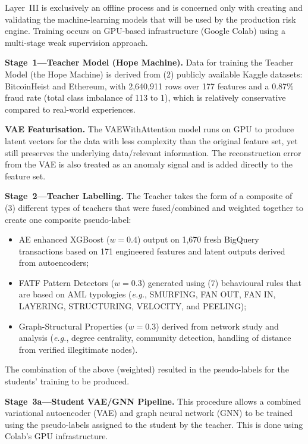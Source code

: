 \documentclass[journal]{IEEEtran}
\newcommand{\eg}{\textit{e.g.}}
\begin{document}
Layer~III is exclusively an offline process and is concerned only with creating and validating the machine-learning models that will be used by the production risk engine. Training occurs on GPU-based infrastructure (Google Colab) using a multi-stage weak supervision approach.

\textbf{Stage~1---Teacher Model (Hope Machine).} Data for training the Teacher Model (the Hope Machine) is derived from (2) publicly available Kaggle datasets: BitcoinHeist and Ethereum, with 2,640,911 rows over 177 features and a 0.87\% fraud rate (total class imbalance of 113 to 1), which is relatively conservative compared to real-world experiences.

\textbf{VAE Featurisation.} The VAEWithAttention model runs on GPU to produce latent vectors for the data with less complexity than the original feature set, yet still preserves the underlying data/relevant information. The reconstruction error from the VAE is also treated as an anomaly signal and is added directly to the feature set.

\textbf{Stage~2---Teacher Labelling.} The Teacher takes the form of a composite of (3) different types of teachers that were fused/combined and weighted together to create one composite pseudo-label:

\begin{itemize}
\item AE enhanced XGBoost ($w=0.4$) output on 1,670 fresh BigQuery transactions based on 171 engineered features and latent outputs derived from autoencoders;
\item FATF Pattern Detectors ($w=0.3$) generated using (7) behavioural rules that are based on AML typologies (\eg, SMURFING, FAN OUT, FAN IN, LAYERING, STRUCTURING, VELOCITY, and PEELING);
\item Graph-Structural Properties ($w=0.3$) derived from network study and analysis (\eg, degree centrality, community detection, handling of distance from verified illegitimate nodes).
\end{itemize}

The combination of the above (weighted) resulted in the pseudo-labels for the students' training to be produced.

\textbf{Stage~3a---Student VAE/GNN Pipeline.} This procedure allows a combined variational autoencoder (VAE) and graph neural network (GNN) to be trained using the pseudo-labels assigned to the student by the teacher. This is done using Colab's GPU infrastructure.
\end{document}
